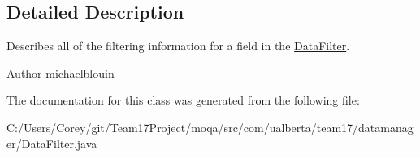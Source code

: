 \subsection{Detailed Description}
Describes all of the filtering information for a field in the \hyperlink{classcom_1_1ualberta_1_1team17_1_1datamanager_1_1_data_filter}{Data\+Filter}.

\begin{DoxyAuthor}{Author}
michaelblouin 
\end{DoxyAuthor}


The documentation for this class was generated from the following file\+:\begin{DoxyCompactItemize}
\item 
C\+:/\+Users/\+Corey/git/\+Team17\+Project/moqa/src/com/ualberta/team17/datamanager/Data\+Filter.\+java\end{DoxyCompactItemize}
